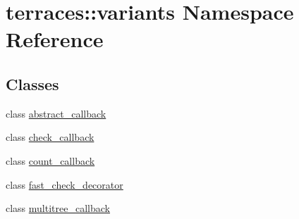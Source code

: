 \hypertarget{namespaceterraces_1_1variants}{}\section{terraces\+:\+:variants Namespace Reference}
\label{namespaceterraces_1_1variants}
\subsection*{Classes}
\begin{DoxyCompactItemize}
\item 
class \hyperlink{classterraces_1_1variants_1_1abstract__callback}{abstract\+\_\+callback}
\item 
class \hyperlink{classterraces_1_1variants_1_1check__callback}{check\+\_\+callback}
\item 
class \hyperlink{classterraces_1_1variants_1_1count__callback}{count\+\_\+callback}
\item 
class \hyperlink{classterraces_1_1variants_1_1fast__check__decorator}{fast\+\_\+check\+\_\+decorator}
\item 
class \hyperlink{classterraces_1_1variants_1_1multitree__callback}{multitree\+\_\+callback}
\end{DoxyCompactItemize}
